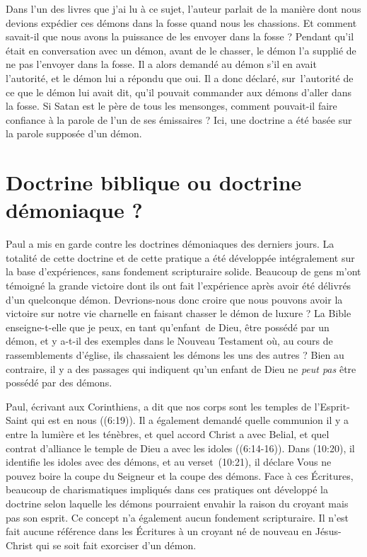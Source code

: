Dans l'un des livres que j'ai lu à ce sujet, l'auteur parlait
 de la manière dont nous devions expédier ces démons dans la fosse
 quand nous les chassions. Et comment savait-il que nous avons la puissance
 de les envoyer dans la fosse ? Pendant qu'il était en conversation
 avec un démon, avant de le chasser, le démon l'a supplié de ne pas
 l'envoyer dans la fosse. Il a alors demandé au démon s'il en avait
 l'autorité, et le démon lui a répondu que oui.
 Il a donc déclaré, sur~l'autorité de ce que le démon lui avait dit,
 qu'il pouvait commander aux démons d'aller dans la fosse.
 Si Satan  est le père de tous les mensonges,
 comment pouvait-il faire
 confiance à la parole de l'un de ses émissaires ?
 Ici, une doctrine a été basée sur la parole supposée d'un démon.


\section{Doctrine biblique ou doctrine d\'emoniaque ?}

Paul a mis en garde contre les doctrines démoniaques des derniers jours.
 La totalité de cette doctrine et de cette pratique a été développée intégralement
 sur la base d'expériences, sans fondement scripturaire solide.
 Beaucoup de gens m'ont témoigné la grande victoire dont ils ont fait
 l'expérience après avoir été délivrés d'un quelconque démon.
 Devrions-nous donc croire que nous pouvons avoir la victoire
 sur notre vie charnelle en faisant chasser le démon de luxure ?
 La Bible enseigne-t-elle que je peux, en tant qu'enfant~de Dieu,
 être possédé par un démon, et y a-t-il des exemples dans le Nouveau
 Testament où, au cours de rassemblements d'église, ils chassaient
 les démons les uns des autres ? Bien au contraire, il y a des passages
 qui indiquent qu'un enfant de Dieu ne \emph{peut pas} être possédé par des démons.

Paul, écrivant aux Corinthiens, a dit que nos corps sont les temples
 de l'Esprit-Saint qui est en nous ((6:19)).
 Il a également demandé quelle communion il y a entre la lumière
 et les ténèbres, et quel accord Christ a avec Belial,
 et quel contrat d'alliance le temple de Dieu a avec les idoles
 ((6:14-16)). Dans (10:20),
 il identifie les idoles avec des démons, et au verset~(10:21),
 il déclare\frcolon{} \Og Vous ne pouvez boire la coupe du Seigneur
 et la coupe des démons. \Fg{} Face à ces Écritures,
 beaucoup de charismatiques impliqués dans ces pratiques
 ont développé la doctrine selon laquelle les démons pourraient envahir
 la raison du croyant mais pas son esprit.
 Ce concept n'a également aucun fondement scripturaire.
 Il n'est fait aucune référence dans les Écritures à un croyant né de nouveau
 en Jésus-Christ qui se soit fait exorciser d'un démon.

